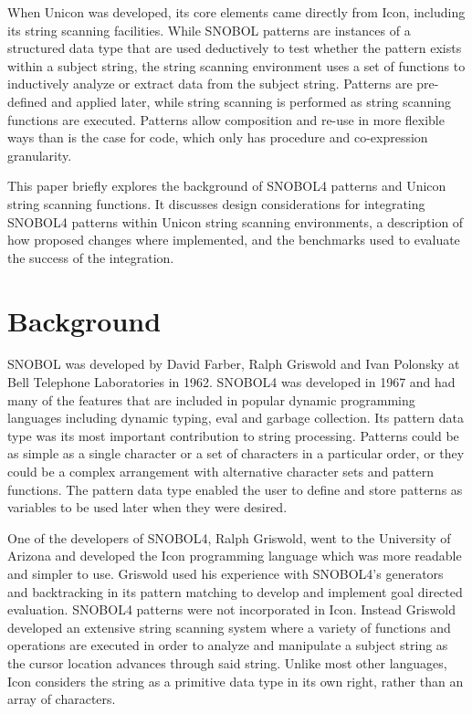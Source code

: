 \documentclass{article}
\begin{document}
When Unicon was developed, its core elements came directly from Icon, including its string scanning facilities.\cite{JefferyUnicon}  While SNOBOL patterns are instances of a structured data type that are used deductively to test whether the pattern exists within a subject string, the string scanning environment uses a set of functions to inductively analyze or extract data from the subject string.  Patterns are pre-defined and applied later, while string scanning is performed as string scanning functions are executed.  Patterns allow composition and re-use in more flexible ways than is the case for code, which only has procedure and co-expression granularity.

This paper briefly explores the background of SNOBOL4 patterns and Unicon string scanning functions.  It discusses design considerations for integrating SNOBOL4 patterns within Unicon string scanning environments, a description of how proposed changes where implemented, and the benchmarks used to evaluate the success of the integration.

\section{Background}
SNOBOL was developed by David Farber, Ralph Griswold and Ivan Polonsky at Bell Telephone Laboratories in 1962.  SNOBOL4 was developed in 1967 and had many of the features that are included in popular dynamic programming languages including dynamic typing, eval and garbage collection.  Its pattern data type was its most important contribution to string processing.  Patterns could be as simple as a single character or a set of characters in a particular order, or they could be a complex arrangement with alternative character sets and pattern functions.  The pattern data type enabled the user to define and store patterns as variables to be used later when they were desired.\cite{Snobol}  

One of the developers of SNOBOL4, Ralph Griswold, went to the University of Arizona and developed the Icon programming language which was more readable and simpler to use.\cite{JefferyUnicon}  Griswold used his experience with SNOBOL4's generators and backtracking in its pattern matching to develop and implement goal directed evaluation.\cite{Gaikaiwari2005}  SNOBOL4 patterns were not incorporated in Icon.  Instead Griswold developed an extensive string scanning system where a variety of functions and operations are executed in order to analyze and manipulate a subject string as the cursor location advances through said string.  Unlike most other languages, Icon considers the string as a primitive data type in its own right, rather than an array of characters. \cite{GriswoldIcon}  
\end{document}
